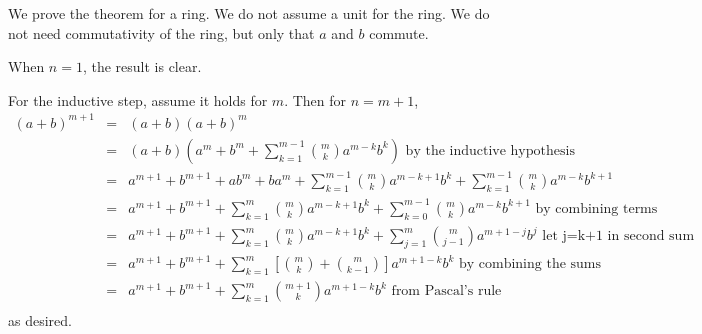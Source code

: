 \documentclass{article}
\begin{document}
We prove the theorem for a ring. We do not assume a unit for the ring.
We do not need commutativity of the ring, but only that $a$ and $b$ commute.

When $n=1$, the result is clear.

For the inductive step, assume it holds for $m$. Then for $n = m+1$,
\begin{eqnarray*}
(a+b)^{m+1} & = & (a+b)(a+b)^m  \\
& = & (a+b)(a^m + b^m+ \sum_{k=1}^{m-1} \binom{m}{k} a^{m-k} b^k )\text{ by the inductive hypothesis} \\
& = & a^{m+1} + b^{m+1} + ab^m + ba^m + \sum_{k=1}^{m-1} \binom{m}{k} a^{m-k+1} b^k + \sum_{k=1}^{m-1} \binom{m}{k} a^{m-k} b^{k+1} \\ 
& = & a^{m+1} + b^{m+1} + \sum_{k=1}^m \binom{m}{k} a^{m-k+1} b^k + \sum_{k=0}^{m-1} \binom{m}{k} a^{m-k} b^{k+1} \text{ by combining terms} \\
& = & a^{m+1} + b^{m+1} + \sum_{k=1}^m \binom{m}{k} a^{m-k+1} b^k + \sum_{j=1}^m \binom{m}{j-1} a^{m+1-j} b^j \text{ let j=k+1 in second sum} \\
& = & a^{m+1} + b^{m+1} + \sum_{k=1}^m \left[ \binom{m}{k} + \binom{m}{k-1} \right] a^{m+1-k}b^k \text{ by combining the sums}\\
& = & a^{m+1} + b^{m+1} + \sum_{k=1}^m \binom{m+1}{k} a^{m+1-k}b^k \text{ from Pascal's rule} \\
\end{eqnarray*}
as desired.
\end{document}
